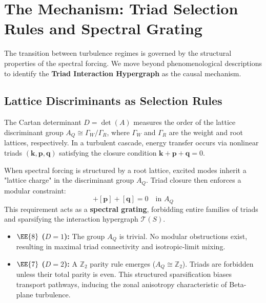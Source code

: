 \section{The Mechanism: Triad Selection Rules and Spectral Grating}

The transition between turbulence regimes is governed by the structural properties of the spectral forcing. We move beyond phenomenological descriptions to identify the \textbf{Triad Interaction Hypergraph} as the causal mechanism.

\subsection{Lattice Discriminants as Selection Rules}

The Cartan determinant $D = \det(A)$ measures the order of the lattice discriminant group $A_Q \cong \Gamma_W/\Gamma_R$, where $\Gamma_W$ and $\Gamma_R$ are the weight and root lattices, respectively. In a turbulent cascade, energy transfer occurs via nonlinear triads $(\mathbf{k}, \mathbf{p}, \mathbf{q})$ satisfying the closure condition $\mathbf{k} + \mathbf{p} + \mathbf{q} = 0$.

\begin{definition}
When spectral forcing is structured by a root lattice, excited modes inherit a "lattice charge" in the discriminant group $A_Q$. Triad closure then enforces a modular constraint:
\begin{equation}
    [\mathbf{k}] + [\mathbf{p}] + [\mathbf{q}] = 0 \quad \text{in } A_Q
\end{equation}
This requirement acts as a \textbf{spectral grating}, forbidding entire families of triads and sparsifying the interaction hypergraph $\mathcal{T}(S)$.
\end{definition}

\begin{itemize}
    \item \textbf{$\EE{8}$ ($D=1$):} The group $A_Q$ is trivial. No modular obstructions exist, resulting in maximal triad connectivity and isotropic-limit mixing.
    \item \textbf{$\EE{7}$ ($D=2$):} A $\mathbb{Z}_2$ parity rule emerges ($A_Q \cong \mathbb{Z}_2$). Triads are forbidden unless their total parity is even. This structured sparsification biases transport pathways, inducing the zonal anisotropy characteristic of Beta-plane turbulence.
\end{itemize}

